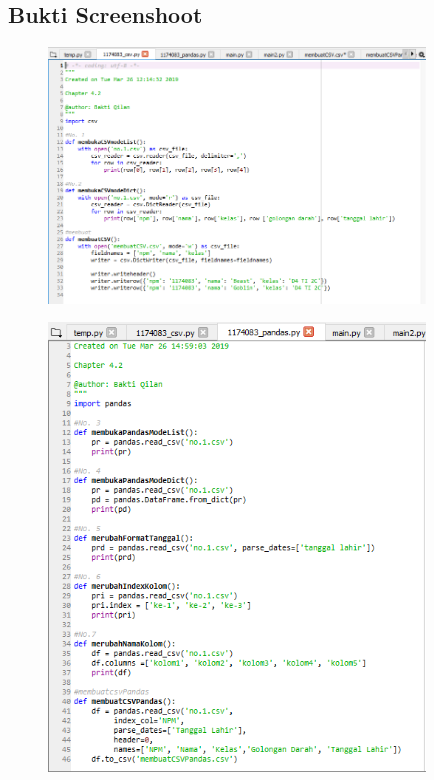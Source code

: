 

\subsection{Bukti Screenshoot}

\begin{figure}[H]
	\includegraphics[width=10cm]{figures/4/1174083/Praktek/kode_praktek_1.png}
	\centering
\end{figure}

\begin{figure}[H]
	\includegraphics[width=10cm]{figures/4/1174083/Praktek/kode_praktek_2.png}
	\centering
\end{figure}

